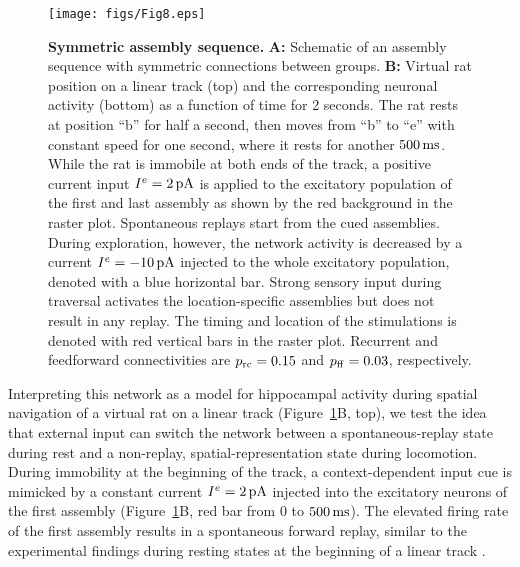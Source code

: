     \begin{figure}[!h]
      \texttt{[image: figs/Fig8.eps]}
      \caption{{\bf Symmetric assembly sequence.}
        \textbf{A:} Schematic of an assembly sequence with symmetric connections
        between groups.
        \textbf{B:} Virtual rat position on a linear track (top) and the
        corresponding neuronal activity (bottom) as a function of time for 2
        seconds. The rat rests at position ``b'' for half a second, then moves
        from ``b'' to ``e'' with constant speed for one second, where it rests
        for another $500 \, \rm ms$. While the rat is immobile at both ends of
        the track, a positive current input $I^e=2 \,\rm pA$ is applied to the
        excitatory population of the first and last assembly as shown by the
        red background in the raster plot. Spontaneous replays start from the
        cued assemblies. During exploration, however, the network activity is
        decreased by a current $I^e=-10 \,\rm pA$ injected to the whole
        excitatory population, denoted with a blue horizontal bar. Strong
        sensory input during traversal activates the location-specific
        assemblies but does not result in any replay. The timing and location
        of the stimulations is denoted with red vertical bars in the raster
        plot.  Recurrent and feedforward connectivities are $p_{\rm rc}=0.15$
        and $p_{\rm  ff}=0.03$, respectively.
      }
    \label{fig8}
    \end{figure}

    Interpreting this network as a model for hippocampal activity during spatial
    navigation of a virtual rat on a linear track (Figure~\ref{fig8}B,
    top), we test the idea that external input can switch the network between a
    spontaneous-replay state during rest and a non-replay, spatial-representation
    state during locomotion. During immobility at the beginning of the track, a
    context-dependent input cue is mimicked by a constant current $I^e=2 \, \rm
    pA$ injected into the excitatory neurons of the first assembly
    (Figure~\ref{fig8}B, red bar from 0 to $500 \, \rm ms$). The elevated
    firing rate of the first assembly results in a spontaneous forward replay,
    similar to the experimental findings during resting states at the beginning
    of a linear track \citep{Foster2006, Diba2007}.

